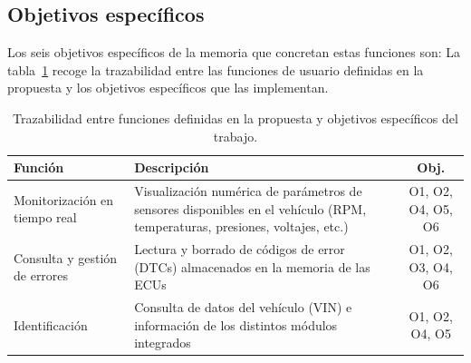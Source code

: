 \subsection{Objetivos específicos}

 Los seis objetivos específicos de la memoria que concretan estas funciones son:
La tabla~\ref{tab:tft01_objetivos} recoge la trazabilidad entre las funciones de usuario definidas en la propuesta y los objetivos específicos que las implementan.

\begin{table}[!htbp]
\caption{Trazabilidad entre funciones definidas en la propuesta y objetivos específicos del trabajo.}
\label{tab:tft01_objetivos}
\centering
\renewcommand{\arraystretch}{1.3}
\begin{tabular}{|p{4.2cm}|p{8.5cm}|c|}
\hline
\textbf{Función} & \textbf{Descripción} & \textbf{Obj.} \\
\hline
Monitorización en tiempo real &
  Visualización numérica de parámetros de sensores disponibles en el vehículo (RPM, temperaturas, presiones, voltajes, etc.) &
  O1, O2, O4, O5, O6 \\
\hline
Consulta y gestión de errores &
  Lectura y borrado de códigos de error (DTCs) almacenados en la memoria de las ECUs &
  O1, O2, O3, O4, O6 \\
\hline
Identificación &
  Consulta de datos del vehículo (VIN) e información de los distintos módulos integrados &
  O1, O2, O4, O5 \\
\hline
\end{tabular}
\end{table}


